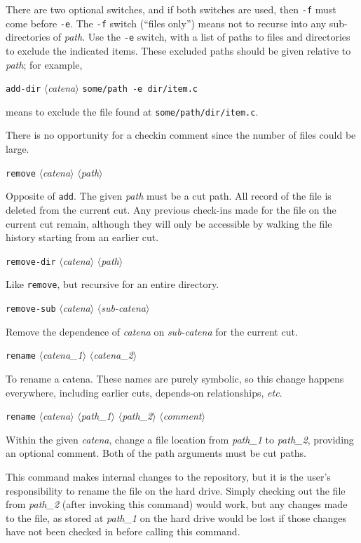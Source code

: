 \documentclass[10pt]{article}
\newcommand{\itarg}[1]{\textit{$\langle$#1$\rangle$}}
\begin{document}
{\begin{hang}
There are two optional switches, and if both switches are used, then
{\tt -f} must come before {\tt -e}. The {\tt -f} switch (``files
only'')  means not to recurse into any sub-directories of {\it path}.
Use the {\tt -e} switch, with a list of paths to files and
directories to exclude the indicated items. These excluded paths
should be given relative to {\it path}; for example,

{\tt add-dir} \itarg{catena} {\tt some/path -e dir/item.c}

\noindent means to exclude the file found at {\tt some/path/dir/item.c}.

There is no opportunity for a checkin comment since the number of
files could be large.

\end{hang}

{\tt remove} \itarg{catena} \itarg{path}
\begin{hang}
Opposite of {\tt add}. The given {\it path} must be a cut path. All
record of the file is deleted from the current cut. 
Any previous check-ins made for the file on the current cut remain, although 
they will only be accessible by walking the file
history starting from an earlier cut.
\end{hang}

{\tt remove-dir} \itarg{catena} \itarg{path}
\begin{hang}
Like {\tt remove}, but recursive for an entire
directory.
\end{hang}

{\tt remove-sub} \itarg{catena} \itarg{sub-catena}
\begin{hang}
Remove the dependence of {\it catena} on {\it sub-catena} for the
current cut.
\end{hang}

{\tt rename} \itarg{catena\_1} \itarg{catena\_2}
\begin{hang}
To rename a catena. These names are purely symbolic, so this change 
happens everywhere, including earlier cuts, depends-on relationships,
{\it etc}.
\end{hang}
  
{\tt rename} \itarg{catena} \itarg{path\_1} \itarg{path\_2} \itarg{comment}
\begin{hang}
Within the given {\it catena}, change a file location from
{\it path\_1} to {\it path\_2}, providing an optional comment. Both of
the path arguments must be cut paths.
  
This command makes internal changes to the repository, but it is the
user's responsibility to rename the file on the hard drive. Simply
checking out the file from {\it path\_2} (after invoking this command)
would work, but any changes made to the file, as stored at {\it path\_1}
on the hard drive would be lost if those changes have not been checked
in before calling this command. 
    

\end{hang}}
\end{document}

